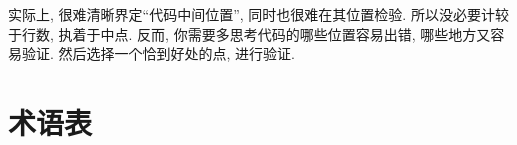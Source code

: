 \documentclass[10pt]{book}
\begin{document}
实际上, 很难清晰界定``代码中间位置'', 同时也很难在其位置检验. 
所以没必要计较于行数, 执着于中点. 
反而, 你需要多思考代码的哪些位置容易出错, 哪些地方又容易验证. 
然后选择一个恰到好处的点, 进行验证. 



\section{术语表}
\end{document}
